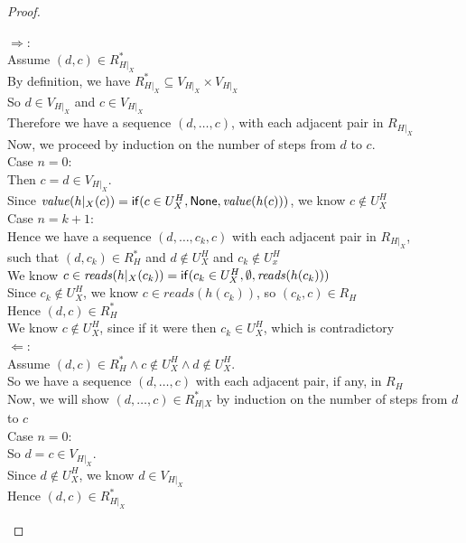 \begin{proof}

\begin{tabbedproof}
\oo $\Rightarrow$: \\
\ooo Assume $(d,c) \in R^*_{H|_X} $ \\
\ooo By definition, we have $R^\ast_{H|_X} \subseteq V_{H|_X} \times V_{H|_X}$ \\
\ooo So $d \in V_{H|_X}$ and $c \in V_{H|_X}$ \\
\ooo Therefore we have a sequence $(d, \ldots, c)$, with each adjacent pair in $R_{H|_X}$ \\
\ooo Now, we proceed by induction on the number of steps from $d$ to $c$. \\
\ooo Case $n = 0$: \\
\oooo Then $c = d \in V_{H|_X}$.\\
\oooo Since $\mathit{value}(h|_{X}(c)) = \mathsf{if}({c \in U^H_X}, {\mathsf{None}}, {\mathit{value}(h(c))})$, we know $c \not\in U^H_X$ \\
\ooo Case $n = k+1$: \\
\oooo Hence we have a sequence $(d, \ldots, c_k, c)$ with each adjacent pair in $R_{H|_X}$, \\
\oooo such that $(d, c_k) \in R^*_H$ and $d \not \in U^H_X$ and $c_k \not \in U^H_x$ \\ 
\oooo We know $c \in \mathit{reads}(h|_X(c_k)) = \mathsf{if}({c_k \in U^H_X}, {\emptyset}, {\mathit{reads}(h(c_k))})$ \\
\oooo Since $c_k \not \in U^H_X$, we know $c \in \mathit{reads}(h(c_k))$, so $(c_k, c) \in R_H$ \\
\oooo Hence $(d, c) \in R^*_H$ \\
\oooo We know $c \not \in U^H_X$, since if it were then $c_k \in U^H_X$, which is contradictory \\
\oo $\Leftarrow$: \\
\ooo Assume $(d,c) \in R^*_H \land c \not\in U^H_X \land d \not\in U^H_X$. \\
\ooo So we have a sequence $(d, \ldots, c)$ with each adjacent pair, if any, in $R_H$ \\
\ooo Now, we will show $(d, \ldots, c) \in R^*_{H|X}$ by induction on the number of steps from $d$ to $c$ \\
\ooo Case $n = 0$: \\
\oooo So $d = c \in V_{H|_X}$. \\
\oooo Since $d \not\in U^H_X$, we know $d \in V_{H|_X}$ \\
\oooo Hence $(d,c) \in R^*_{H|_X}$ \\

\end{tabbedproof}
\end{proof}
